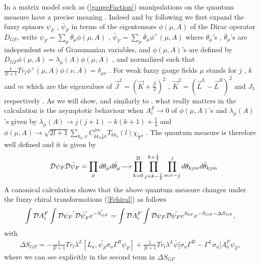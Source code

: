 \documentclass[a4paper,10pt]{article}
\begin{document}
In a matrix model such as (\ref{gaugeFaction}) manipulations on
the quantum measure have a precise meaning . Indeed and by
following \cite{fujikawa} we first expand the fuzzy spinors
${\psi}_{F}$ , $\bar{\psi}_{F}$ in terms of the eigentensors
${\phi}(\mu,A)$ of the Dirac operator ${D}_{GF}$, write $
{\psi}_{F}=\sum_{\mu}{\theta}_{\mu}{\phi}(\mu,A)$ , $
\bar{\psi}_{F}=\sum_{\mu}\bar{\theta}_{\mu}{\phi}^{+}(\mu,A)$
where ${\theta}_{\mu}$'s , $\bar{\theta}_{\mu}$'s are independent
sets of Grassmanian variables, and ${\phi}(\mu,A)$'s are defined
by ${D}_{GF}{\phi}(\mu,A)={\lambda}_{\mu}(A){\phi}(\mu,A)$ ,
 and
normalized such that $
\frac{1}{2l+1}Tr_{l}{\phi}^{+}(\mu,A){\phi}(\nu,A)={\delta}_{\mu
\nu }$ . For weak fuzzy gauge fields $\mu$ stands for $j$ , $k$
and $m$ which are the eigenvalues of
$\vec{J}^2=(\vec{K}+\frac{\vec{\sigma}}{2})^2$ ,
$\vec{K}^2=(\vec{L}^L-\vec{L}^R)^2$ and $J_3$ respectively . As
we will show, and similarly to \cite{fujikawa} , what really
matters in the calculation is the asymptotic behaviour when
$A^F_i{\longrightarrow}0$ of ${\phi}(\mu,A)$'s and
${\lambda}_{\mu}(A)$'s given by
${\lambda}_{\mu}(A){\longrightarrow}j(j+1)-k(k+1)+\frac{1}{4}$ and
$
{\phi}(\mu,A){\longrightarrow}\sqrt{2l+1}\sum_{k_3,\sigma}C^{jm}_{kk_3\frac{1}{2}\sigma}T_{kk_3}(l)
{\chi}_{\frac{1}{2}\sigma}$ \cite{ydri,grosse,VKM} . The quantum
measure is therefore well defined  and it is given by
\begin{eqnarray}
&&{\cal D}{\psi}_{F}{\cal
D}\bar{\psi}_{F}=\prod_{\mu}d{\theta}_{\mu}d{\bar{\theta}_{\mu}}{\longrightarrow}\prod_{k=0}^{2l}\prod_{j=k-\frac{1}{2}}^{k+\frac{1}{2}}\prod_{m=-j}^{j}d{\theta}_{kjm}d{\bar{\theta}_{kjm}}
\end{eqnarray}
A canonical calculation shows that the above quantum measure
changes under the fuzzy chiral transformations (\ref{Fchiral}) as
follows
\begin{eqnarray}
\int {\cal D}{A}_i^F\int {\cal D}{{\psi}_{F}}^{'}{\cal
D}\bar{{\psi}}_{F}^{'}e^{-S^{'}_{GF}}=\int {\cal D}{ A}_i^F\int
{\cal D}{{\psi}_{F}}{\cal
D}\bar{{\psi}_{F}}e^{{S}_{{\theta}F}}e^{-S_{GF}-{\Delta}S_{GF}},\label{partition0}
\end{eqnarray}
with
\begin{eqnarray}
{\Delta}S_{GF}=-\frac{1}{2l+1}Tr_{l}{\lambda}^L[L_a,\bar{{\psi}_F}{\sigma}_a{\Gamma}^R{{\psi}_F}]+\frac{1}{2l+1}Tr_{l}{\lambda}^L\bar{\psi}\big[{\sigma}_a{\Gamma}^R-{\Gamma}^L{\sigma}_a\big]A_a^F{\psi}_F,\label{delta}
\end{eqnarray}
where we can see explicitly in the second term in ${\Delta}S_{GF}$
\end{document}
